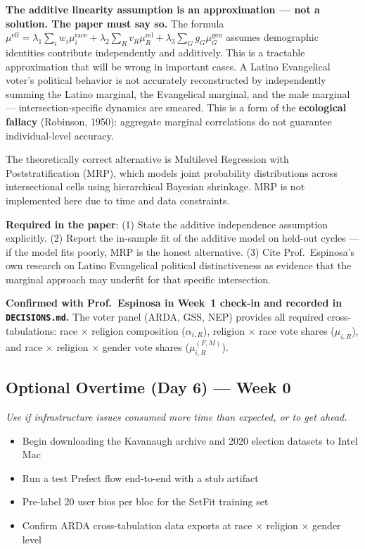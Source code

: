 \documentclass[11pt]{article}
\begin{document}
\begin{mdframed}[style=warnbox]
\textbf{The additive linearity assumption is an approximation --- not a solution.
The paper must say so.}
The formula $\mu^{\text{eff}} = \lambda_1\sum_i w_i\mu_i^{\text{race}}
+ \lambda_2\sum_R v_R\mu_R^{\text{rel}} + \lambda_3\sum_G g_G\mu_G^{\text{gen}}$
assumes demographic identities contribute independently and additively. This is a
tractable approximation that will be wrong in important cases. A Latino Evangelical
voter's political behavior is not accurately reconstructed by independently summing
the Latino marginal, the Evangelical marginal, and the male marginal ---
intersection-specific dynamics are smeared. This is a form of the
\textbf{ecological fallacy} (Robinson, 1950): aggregate marginal correlations do not
guarantee individual-level accuracy.

The theoretically correct alternative is Multilevel Regression with
Poststratification (MRP), which models joint probability distributions across
intersectional cells using hierarchical Bayesian shrinkage. MRP is not implemented
here due to time and data constraints.

\textbf{Required in the paper}: (1) State the additive independence assumption
explicitly. (2) Report the in-sample fit of the additive model on held-out cycles
--- if the model fits poorly, MRP is the honest alternative. (3) Cite Prof.\
Espinosa's own research on Latino Evangelical political distinctiveness as evidence
that the marginal approach may underfit for that specific intersection.
\end{mdframed}

\medskip
\noindent\textbf{Confirmed with Prof.\ Espinosa in Week~1 check-in and recorded in
\texttt{DECISIONS.md}.} The voter panel (ARDA, GSS, NEP) provides all required
cross-tabulations: race $\times$ religion composition ($\alpha_{i,R}$), religion
$\times$ race vote shares ($\mu_{i,R}$), and race $\times$ religion $\times$ gender
vote shares ($\mu_{i,R}^{(F,M)}$).

\subsection*{Optional Overtime (Day 6) --- Week 0}
\textit{Use if infrastructure issues consumed more time than expected, or to get ahead.}
\begin{itemize}[leftmargin=1.6em, itemsep=2pt]
  \item Begin downloading the Kavanaugh archive and 2020 election datasets to Intel Mac
  \item Run a test Prefect flow end-to-end with a stub artifact
  \item Pre-label 20 user bios per bloc for the SetFit training set
  \item Confirm ARDA cross-tabulation data exports at race $\times$ religion $\times$ gender level
\end{itemize}
\end{document}
